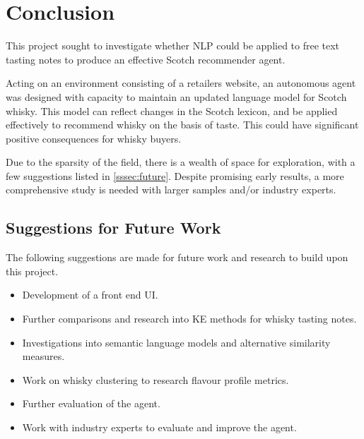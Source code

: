 \section{Conclusion}\label{sec:conc}
This project sought to investigate whether NLP could be applied to free text tasting notes 
to produce an effective Scotch recommender agent.

Acting on an environment consisting of a retailers website, an autonomous
agent was designed with capacity to maintain an updated language model for Scotch whisky. This model
can reflect changes in the Scotch lexicon, and be applied effectively to recommend whisky on the basis of
taste. This could have significant positive consequences for whisky buyers.

Due to the sparsity of the field, there is a wealth of space for exploration, with a few suggestions listed
in \autoref{sssec:future}.  Despite promising early results, a more comprehensive study is needed
with larger samples and/or industry experts.

\subsection{Suggestions for Future Work}\label{sssec:future}

The following suggestions are made for future work and research to build upon this project.

\begin{itemize}
    \item Development of a front end UI.
    \item Further comparisons and research into KE methods for whisky tasting notes.
    \item Investigations into semantic language models and alternative similarity measures.
    \item Work on whisky clustering to research flavour profile metrics.
    \item Further evaluation of the agent.
    \item Work with industry experts to evaluate and improve the agent.
\end{itemize}